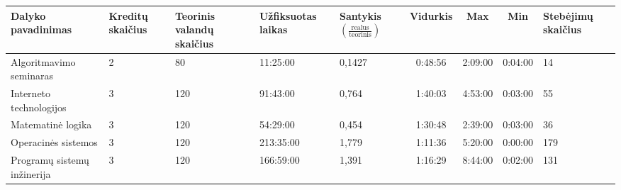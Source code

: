 \begin{sidewaystable}
\centering
\begin{tabular}{|p{10em}|p{50pt}|p{50pt}|p{5.5em}|p{4em}|c|c|c|p{5em}|}
  \hline
  {\bf Dalyko pavadinimas}    & {\bf Kreditų skaičius} & {\bf Teorinis valandų skaičius} & {\bf Užfiksuotas laikas} & {\bf Santykis $\left(\frac{\text{realus}}{\text{teorinis}}\right)$} & {\bf Vidurkis } & {\bf Max} & {\bf Min} & {\bf Stebėjimų skaičius}  \\
  \hline
  Algoritmavimo seminaras     & 2                      & 80                              & 11:25:00                 & 0,1427                                                   & 0:48:56 & 2:09:00 & 0:04:00 & 14 \\
  \hline                                                                                                                                                                         
  Interneto technologijos     & 3                      & 120                             & 91:43:00                 & 0,764                                                    & 1:40:03 & 4:53:00 & 0:03:00 & 55 \\
  \hline                                                                                                                                                                         
  Matematinė logika           & 3                      & 120                             & 54:29:00                 & 0,454                                                    & 1:30:48 & 2:39:00 & 0:03:00 & 36 \\
  \hline                                                                                                                                                                         
  Operacinės sistemos         & 3                      & 120                             & 213:35:00                & 1,779                                                    & 1:11:36 & 5:20:00 & 0:00:00 & 179 \\
  \hline                                                                                                                                                                         
  Programų sistemų inžinerija & 3                      & 120                             & 166:59:00                & 1,391                                                    & 1:16:29 & 8:44:00 & 0:02:00 & 131 \\
  \hline                                                                                                                                                                         

\end{tabular}
\end{sidewaystable}
